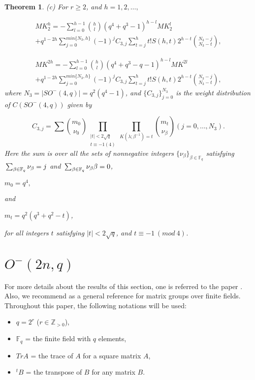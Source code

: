 \documentclass[a4,12pt]{elsart}
\newtheorem{theorem}{Theorem}
\begin{document}
\begin{theorem}
(c) For $r \geq 2$, and $h = 1,2,\ldots,$

 \begin{multline}\label{a6}
     MK_2^h = -\sum_{l=0}^{h-1}{h \choose l}(q^4 + q^3 -1)^{h-l} MK_2^l\\
        +q^{1-2h}\sum_{j=0}^{min\{N_3,h\}}(-1)^{j}C_{3,j}\sum_{t=j}^{h}t!S(h,t)2^{h-t}{N_3-j \choose
        N_3-t},
  \end{multline}

 \begin{multline}\label{a7}
     MK^{2h} = -\sum_{l=0}^{h-1}{h \choose l}(q^4 + q^3 - q - 1)^{h-l} MK^{2l}\\
             +q^{1-2h}\sum_{j=0}^{min\{N_3,h\}}(-1)^{j}C_{3,j}\sum_{t=j}^{h}t!S(h,t)2^{h-t}{N_3-j \choose
        N_3-t},
  \end{multline}
 where $N_3 = \mid SO^-(4,q) \mid = q^2(q^4-1)$, and
$\{C_{3,j}\}_{j=0}^{N_3}$ is the weight distribution of
$C(SO^-(4,q))$ given by

\begin{equation}\label{a8}
C_{3,j} = \sum {m_0 \choose \nu_0} \prod_{\substack{\mid t \mid <
2\sqrt{q}\\t\equiv-1(4)}} \prod_{K(\lambda;\beta^{-1})=t} {m_t
\choose \nu_\beta} (j = 0,\ldots,N_3).
\end{equation}
Here the sum is over all the sets of nonnegative integers
$\{\nu_\beta\}_{\beta \in {\mathbb{F}}_q}$  satisfying ${\displaystyle} \sum_{\beta \in
{\mathbb{F}}_q} \nu_\beta = j$ and ${\displaystyle}\sum_{\beta \in {\mathbb{F}}_q} \nu_\beta
\beta = 0$,
\begin{center}
$m_0 = q^4, $
\end{center}
and
\begin{center}
 $m_t = q^2(q^3+q^2-t)$,
\end{center}
for all integers $t$ satisfying $|t| < 2 \sqrt{q}$, and $t \equiv -1
~(mod ~4)$.
\end{theorem}
\section{$O^-(2n,q)$}

For more details about the results of this section, one is referred
to the paper \cite{DY}. Also, we recommend \cite{ZX} as a general
reference for matrix groups over finite fields. Throughout this
paper, the following notations will be used:\\

\begin{itemize}
 \item [] $q = 2^r$ ($r \in {\mathbb{Z}}_{>0}$),\\
 \item [] ${\mathbb{F}}_q$ = the finite field with $q$ elements,\\
 \item [] $Tr A$ = the trace of $A$ for a square matrix $A$,\\
 \item [] $^tB$ = the transpose of $B$ for any matrix $B$.
\end{itemize}\
\end{document}
